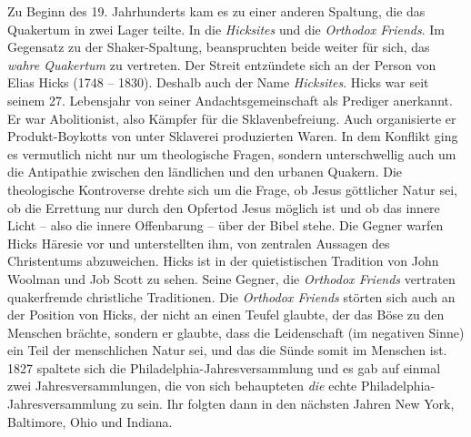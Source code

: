 Zu Beginn des 19. Jahrhunderts kam es zu einer anderen Spaltung, die das
Quakertum in zwei Lager teilte.
In die \textit{Hicksites} und die
\textit{Orthodox
Friends}. Im Gegensatz zu der Shaker-Spaltung,
beanspruchten beide weiter für
sich, das \textit{wahre Quakertum} zu vertreten. Der Streit entzündete sich an
der Person von Elias Hicks (1748 -- 1830).
Deshalb
auch der Name \textit{Hicksites}.
Hicks war seit seinem 27. Lebensjahr von seiner Andachtsgemeinschaft als
Prediger
anerkannt. Er war Abolitionist, also Kämpfer
für die Sklavenbefreiung. Auch
organisierte er Produkt-Boykotts von unter Sklaverei produzierten Waren. In dem
Konflikt ging es vermutlich nicht nur um theologische Fragen, sondern
unterschwellig auch um die Antipathie zwischen den ländlichen und den urbanen
Quakern. Die theologische Kontroverse drehte sich um die Frage, ob Jesus
göttlicher Natur sei, ob die Errettung nur durch den Opfertod Jesus möglich ist
und ob das innere Licht -- also die innere Offenbarung --
über der Bibel stehe.
Die Gegner warfen Hicks Häresie vor und unterstellten ihm, von zentralen
Aussagen des Christentums abzuweichen. Hicks ist in der quietistischen
 Tradition
von John Woolman und Job Scott
 zu sehen. Seine Gegner, die \textit{Orthodox
Friends} vertraten quakerfremde christliche
Traditionen. Die
\textit{Orthodox Friends} störten sich auch an der Position von Hicks, der nicht
an einen Teufel glaubte, der das Böse zu den Menschen
brächte, sondern er
glaubte, dass die Leidenschaft (im negativen Sinne) ein Teil der menschlichen
Natur sei, und das die Sünde somit im Menschen ist. 1827 spaltete
sich die
Philadelphia-Jahresversammlung und es gab auf einmal zwei Jahresversammlungen,
die von sich behaupteten \textit{die} echte Philadelphia-Jahresversammlung zu
sein.
Ihr folgten dann in den nächsten Jahren New York,
Baltimore, Ohio und
Indiana.

\medskip

